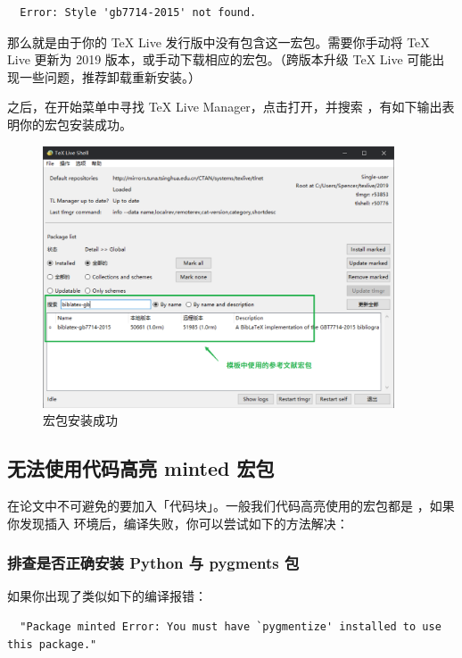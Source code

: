 \begin{verbatim}
  Error: Style 'gb7714-2015' not found.
\end{verbatim}

那么就是由于你的 TeX Live 发行版中没有包含这一宏包。需要你手动将 TeX Live 更新为 2019 版本，或手动下载相应的宏包。（跨版本升级 TeX Live 可能出现一些问题，推荐卸载重新安装。）

之后，在开始菜单中寻找 TeX Live Manager，点击打开，并搜索 ，有如下输出表明你的宏包安装成功。

\begin{figure}[H]
  \flushright
  \includegraphics[width=0.93\textwidth]{images/package_install_success.png}
  \caption{宏包安装成功}
  \label{package_install_success}
\end{figure}

\subsection{无法使用代码高亮 minted 宏包}

在论文中不可避免的要加入「代码块」。一般我们代码高亮使用的宏包都是 ，如果你发现插入  环境后，编译失败，你可以尝试如下的方法解决：

\subsubsection{排查是否正确安装 Python 与 pygments 包}

如果你出现了类似如下的编译报错：

\begin{verbatim}
  "Package minted Error: You must have `pygmentize' installed to use this package."
\end{verbatim}


